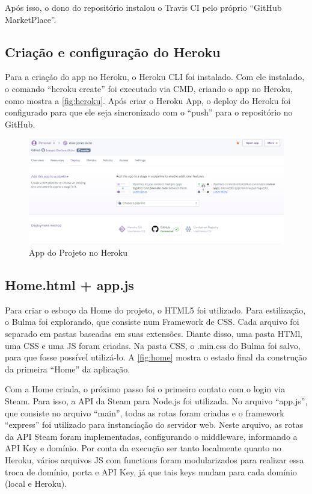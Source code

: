 Após isso, o dono do repositório instalou o Travis CI pelo próprio ``GitHub MarketPlace''.

\subsection{Criação e configuração do Heroku}
Para a criação do app no Heroku, o Heroku CLI foi instalado. Com ele instalado, o comando
``heroku create'' foi executado via CMD, criando o app no Heroku, como mostra a \autoref{fig:heroku}. Após criar o Heroku App, o deploy do Heroku foi configurado
para que ele seja sincronizado com o ``push'' para o repositório no GitHub.\\
\begin{figure}[!htb]
	\centering
	\includegraphics[scale=0.5]{Imagens/Heroku.png}
	\caption{App do Projeto no Heroku}
	\label{fig:heroku}
\end{figure}

\subsection{Home.html + app.js}
Para criar o esboço da Home do projeto, o HTML5 foi utilizado. Para estilização, o Bulma foi explorando,
que consiste num Framework de CSS. Cada arquivo foi separado em pastas baseadas em suas extensões. 
Diante disso, uma pasta HTMl, uma CSS e uma JS foram criadas. Na pasta CSS, o .min.css do Bulma foi salvo, para que fosse possível utilizá-lo. A \autoref{fig:home} mostra o estado final da construção da primeira ``Home'' da aplicação.

Com a Home criada, o próximo passo foi o primeiro contato com o login via Steam. Para isso, a API
da Steam para Node.js foi utilizada. No arquivo ``app.js'', que consiste no arquivo ``main'', todas as rotas foram criadas
e o framework ``express'' foi utilizado para instanciação do servidor web. Neste arquivo, as rotas da API Steam foram implementadas, configurando
o middleware, informando a API Key e domínio. Por conta da execução ser tanto localmente quanto no Heroku, 
vários arquivos JS com functions foram modularizados para realizar essa troca de domínio, porta e API Key, já que tais keys mudam para cada domínio (local e Heroku). 

